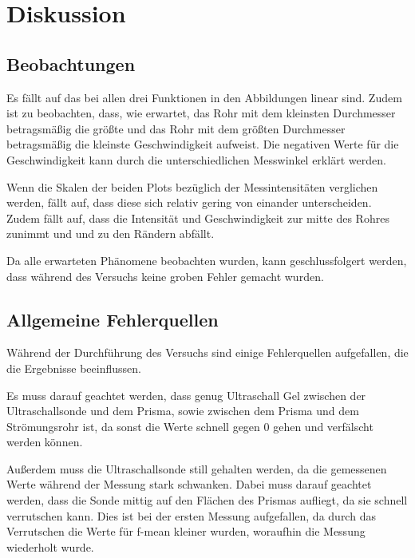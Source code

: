 \section{Diskussion}
\label{sec:Diskussion}
\subsection{Beobachtungen}
Es fällt auf das bei allen drei Funktionen in den Abbildungen linear sind. Zudem ist zu beobachten, dass, wie erwartet, das Rohr mit dem kleinsten Durchmesser betragsmäßig die größte und das 
Rohr mit dem größten Durchmesser betragsmäßig die kleinste Geschwindigkeit aufweist. Die negativen Werte für die Geschwindigkeit kann durch die unterschiedlichen Messwinkel erklärt werden.

\noindent
Wenn die Skalen der beiden Plots bezüglich der Messintensitäten verglichen werden, fällt auf, dass diese sich relativ gering von einander unterscheiden. Zudem fällt auf, dass die Intensität
und Geschwindigkeit zur mitte des Rohres zunimmt und und zu den Rändern abfällt.

\noindent
Da alle erwarteten Phänomene beobachten wurden, kann geschlussfolgert werden, dass während des Versuchs keine groben Fehler gemacht wurden.

\subsection{Allgemeine Fehlerquellen}
\noindent
Während der Durchführung des Versuchs sind einige Fehlerquellen aufgefallen, die die Ergebnisse beeinflussen.

\noindent
Es muss darauf geachtet werden, dass genug Ultraschall Gel zwischen der Ultraschallsonde und dem Prisma, 
sowie zwischen dem Prisma und dem Strömungsrohr ist, da sonst die Werte schnell gegen 0 gehen und verfälscht werden können.

\noindent
Außerdem muss die Ultraschallsonde still gehalten werden, da die gemessenen Werte während der Messung stark schwanken.
Dabei muss darauf geachtet werden, dass die Sonde mittig auf den Flächen des Prismas aufliegt, da sie schnell verrutschen kann.
Dies ist bei der ersten Messung aufgefallen, da durch das Verrutschen die Werte für f-mean kleiner wurden, 
woraufhin die Messung wiederholt wurde.

\noindent
